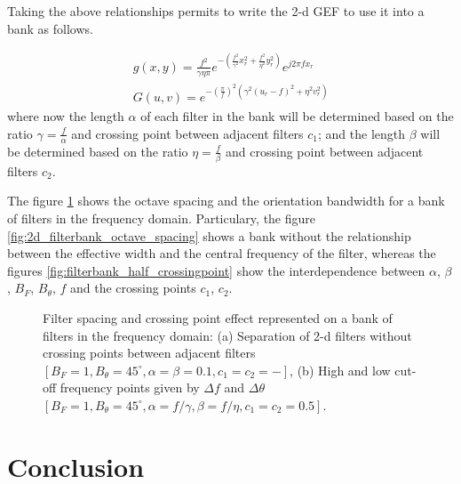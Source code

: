 Taking the above relationships permits to write the 2-d GEF to use it into a bank as follows. 

\begin{equation}\label{eq:gabor_function_2d_spacefreq_bank}
    \begin{gathered}
         g(x,y) =  \frac{f^2}{\gamma \eta \pi} e ^{-\left(\frac{f^2}{\gamma^2} x_r^2 + \frac{f^2}{\eta^2} y_r^2\right)} e ^{j 2 \pi f x_r } \\
         G(u,v) =  e ^{-\left(\frac{\pi}{f}\right)^2\left( \gamma^2 (u_r-f)^2 + \eta^2 v_r^2\right)}
     \end{gathered}
\end{equation}
where now the length $\alpha$ of each filter in the bank will be determined based on the ratio $\gamma = \frac{f}{\alpha}$ and crossing point between adjacent filters $c_1$; and the length $\beta$ will be determined based on the ratio $\eta = \frac{f}{\beta}$ and crossing point between adjacent filters $c_2$.

The figure \ref{fig:2d_filterbank_spacing} shows the octave spacing and the orientation bandwidth for a bank of filters in the frequency domain. Particulary, the figure \ref{fig:2d_filterbank_octave_spacing} shows a bank without the relationship between the effective width and the central frequency of the filter, whereas the figures \ref{fig:filterbank_half_crossingpoint} show the interdependence between $\alpha$, $\beta$, $B_F$, $B_{\theta}$, $f$ and the crossing points $c_1$, $c_2$.

\begin{figure}[!ht]
\centering
\caption{Filter spacing and crossing point effect represented on a bank of filters in the frequency domain: (a) Separation of 2-d filters without crossing points between adjacent filters $[B_F=1, B_{\theta} = 45^{\circ}, \alpha=\beta=0.1, c_1=c_2=-]$, (b) High and low cut-off frequency points given by $\Delta f$ and $\Delta \theta$ $[B_F=1, B_{\theta} = 45^{\circ}, \alpha=f/\gamma, \beta=f/\eta, c_1=c_2=0.5]$.}\label{fig:2d_filterbank_spacing}
\end{figure}

\section{Conclusion}
